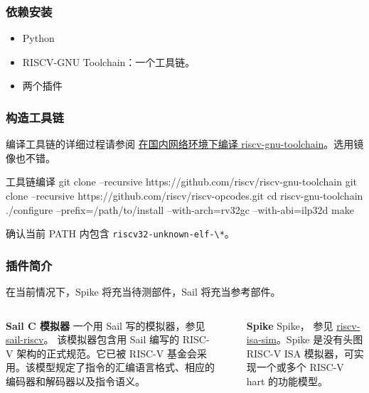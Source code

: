\documentclass[xcolor=table,dvipsnames,svgnames,aspectratio=169]{ctexbeamer}
\begin{document}
\begin{frame}
  \frametitle{依赖安装}
  \begin{itemize}
    \item Python
    \item RISCV-GNU Toolchain：一个工具链。
    \item 两个插件
  \end{itemize}
\end{frame}

\begin{frame}[fragile]
  \frametitle{构造工具链}

  编译工具链的详细过程请参阅 \href{https://github.com/ArielHeleneto/Work-PLCT/blob/master/help/build-riscv-toolchain.md}{在国内网络环境下编译 riscv-gnu-toolchain}。选用镜像也不错。

  \begin{codeblock}[language=bash]{工具链编译}
git clone --recursive https://github.com/riscv/riscv-gnu-toolchain
git clone --recursive https://github.com/riscv/riscv-opcodes.git
cd riscv-gnu-toolchain
./configure --prefix=/path/to/install --with-arch=rv32gc --with-abi=ilp32d
make
  \end{codeblock}

  确认当前 PATH 内包含 \lstinline|riscv32-unknown-elf-\*|。
\end{frame}

\begin{frame}
  \frametitle{插件简介}

  在当前情况下，Spike 将充当待测部件，Sail 将充当参考部件。

  \begin{columns}[T]
    \begin{column}{.5\textwidth}
      \alert{\textbf{Sail C 模拟器}}
      \stamphrule
      一个用 Sail 写的模拟器，参见 \href{https://github.com/riscv/sail-riscv.git}{sail-riscv}。
      该模拟器包含用 Sail 编写的 RISC-V 架构的正式规范。它已被 RISC-V 基金会采用。该模型规定了指令的汇编语言格式、相应的编码器和解码器以及指令语义。
    \end{column}
    \textcolor{cprimary}{\vrule}\hfill
    \begin{column}{.5\textwidth}
      \alert{\textbf{Spike}}
      \stamphrule
      Spike， 参见 \href{https://github.com/riscv-software-src/riscv-isa-sim.git}{riscv-isa-sim}。Spike 是没有头图 RISC-V ISA 模拟器，可实现一个或多个 RISC-V hart 的功能模型。
    \end{column}
  \end{columns}

\end{frame}
\end{document}
